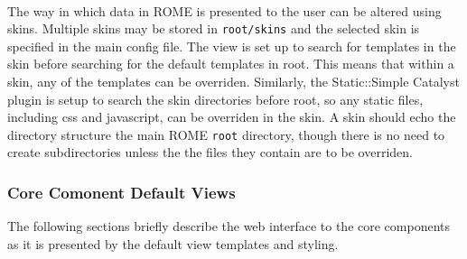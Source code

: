\paragraph{}
The way in which data in ROME is presented to the user can be altered using skins. Multiple skins may be stored in \texttt{root/skins} and the selected skin is specified in the main config file. The view is set up to search for templates in the skin before searching for the default templates in root. This means that within a skin, any of the templates can be overriden. Similarly, the Static::Simple Catalyst plugin is setup to search the skin directories before root, so any static files, including css and javascript, can be overriden in the skin. A skin should echo the directory structure the main ROME \texttt{root} directory, though there is no need to create subdirectories unless the the files they contain are to be overriden. 


\subsubsection{Core Comonent Default Views}
The following sections briefly describe the web interface to the core components as it is presented by the default view templates and styling.



